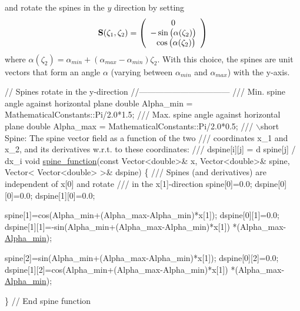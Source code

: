 and rotate the spines in the $ y $ direction by setting \[ {\bf S}(\zeta_1,\zeta_2) = \left( \begin{array}{c} 0 \\ -\sin\big(\alpha(\zeta_2)\big) \\ \ \ \cos\big(\alpha(\zeta_2)\big) \\ \end{array} \right) \] where $ \alpha(\zeta_2) = \alpha_{min} + (\alpha_{max}-\alpha_{min}) \zeta_2 $. With this choice, the spines are unit vectors that form an angle $ \alpha $ (varying between $ \alpha_{min} $ and $ \alpha_{max} $) with the y-\/axis.


\begin{DoxyCodeInclude}
 
 

 \textcolor{comment}{// Spines rotate in the y-direction}
 \textcolor{comment}{//---------------------------------}
\textcolor{comment}{}
\textcolor{comment}{ /// Min. spine angle against horizontal plane}
\textcolor{comment}{} \textcolor{keywordtype}{double} Alpha\_min = MathematicalConstants::Pi/2.0*1.5;
\textcolor{comment}{}
\textcolor{comment}{ /// Max. spine angle against horizontal plane}
\textcolor{comment}{} \textcolor{keywordtype}{double} Alpha\_max = MathematicalConstants::Pi/2.0*0.5;
\textcolor{comment}{}
\textcolor{comment}{ /// \(\backslash\)short Spine: The spine vector field as a function of the two }
\textcolor{comment}{ /// coordinates x\_1 and x\_2, and its derivatives w.r.t. to these coordinates:}
\textcolor{comment}{ /// dspine[i][j] = d spine[j] / dx\_i}
\textcolor{comment}{} \textcolor{keywordtype}{void} \hyperlink{namespaceGlobalParameters_a82df8c67f58e78a236fb6a0cc8bf8284}{spine\_function}(\textcolor{keyword}{const} Vector<double>& x, 
                     Vector<double>& spine, 
                     Vector< Vector<double> >& dspine)
 \{
  \textcolor{comment}{}
\textcolor{comment}{  /// Spines (and derivatives)  are independent of x[0] and rotate }
\textcolor{comment}{  /// in the x[1]-direction}
\textcolor{comment}{}  spine[0]=0.0;
  dspine[0][0]=0.0; 
  dspine[1][0]=0.0; 
  
  spine[1]=cos(Alpha\_min+(Alpha\_max-Alpha\_min)*x[1]); 
  dspine[0][1]=0.0;                                   
  dspine[1][1]=-sin(Alpha\_min+(Alpha\_max-Alpha\_min)*x[1])
   *(Alpha\_max-\hyperlink{namespaceGlobalParameters_ae8fa7610a34b7a2a8223eade99a5c22f}{Alpha\_min});            
  
  spine[2]=sin(Alpha\_min+(Alpha\_max-Alpha\_min)*x[1]);
  dspine[0][2]=0.0;                                  
  dspine[1][2]=cos(Alpha\_min+(Alpha\_max-Alpha\_min)*x[1]) 
   *(Alpha\_max-\hyperlink{namespaceGlobalParameters_ae8fa7610a34b7a2a8223eade99a5c22f}{Alpha\_min});            

 \} \textcolor{comment}{// End spine function}

\end{DoxyCodeInclude}




